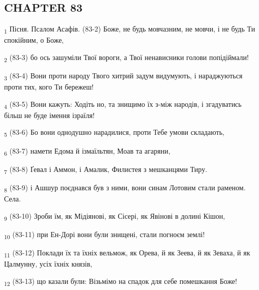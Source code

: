 \subsection{CHAPTER 83}
\begin{tcolorbox}
\textsubscript{1} Пісня. Псалом Асафів. (83-2) Боже, не будь мовчазним, не мовчи, і не будь Ти спокійним, о Боже,
\end{tcolorbox}
\begin{tcolorbox}
\textsubscript{2} (83-3) бо ось зашуміли Твої вороги, а Твої ненависники голови попідіймали!
\end{tcolorbox}
\begin{tcolorbox}
\textsubscript{3} (83-4) Вони проти народу Твого хитрий задум видумують, і нараджуються проти тих, кого Ти бережеш!
\end{tcolorbox}
\begin{tcolorbox}
\textsubscript{4} (83-5) Вони кажуть: Ходіть но, та знищимо їх з-між народів, і згадуватись більш не буде імення ізраїля!
\end{tcolorbox}
\begin{tcolorbox}
\textsubscript{5} (83-6) Бо вони однодушно нарадилися, проти Тебе умови складають,
\end{tcolorbox}
\begin{tcolorbox}
\textsubscript{6} (83-7) намети Едома й ізмаїльтян, Моав та агаряни,
\end{tcolorbox}
\begin{tcolorbox}
\textsubscript{7} (83-8) Ґевал і Аммон, і Амалик, Филистея з мешканцями Тиру.
\end{tcolorbox}
\begin{tcolorbox}
\textsubscript{8} (83-9) і Ашшур поєднався був з ними, вони синам Лотовим стали раменом. Села.
\end{tcolorbox}
\begin{tcolorbox}
\textsubscript{9} (83-10) Зроби їм, як Мідіянові, як Сісері, як Явінові в долині Кішон,
\end{tcolorbox}
\begin{tcolorbox}
\textsubscript{10} (83-11) при Ен-Дорі вони були знищені, стали погноєм землі!
\end{tcolorbox}
\begin{tcolorbox}
\textsubscript{11} (83-12) Поклади їх та їхніх вельмож, як Орева, й як Зеева, й як Зеваха, й як Цалмунну, усіх їхніх князів,
\end{tcolorbox}
\begin{tcolorbox}
\textsubscript{12} (83-13) що казали були: Візьмімо на спадок для себе помешкання Боже!
\end{tcolorbox}
